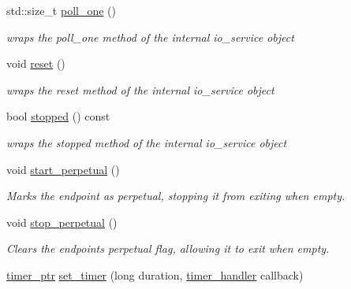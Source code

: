 \begin{DoxyCompactItemize}
std\+::size\+\_\+t \mbox{\hyperlink{classwebsocketpp_1_1transport_1_1asio_1_1endpoint_ae413ac572300c418cfd822845960cc6c}{poll\+\_\+one}} ()
\begin{DoxyCompactList}\small\item\em wraps the poll\+\_\+one method of the internal io\+\_\+service object \end{DoxyCompactList}\item 
\mbox{\label{classwebsocketpp_1_1transport_1_1asio_1_1endpoint_ac79a1a69f86df035471ccdc9f4aea351}} 
void \mbox{\hyperlink{classwebsocketpp_1_1transport_1_1asio_1_1endpoint_ac79a1a69f86df035471ccdc9f4aea351}{reset}} ()
\begin{DoxyCompactList}\small\item\em wraps the reset method of the internal io\+\_\+service object \end{DoxyCompactList}\item 
\mbox{\label{classwebsocketpp_1_1transport_1_1asio_1_1endpoint_a633264e7fd0ab7623cac336f2eb85aa0}} 
bool \mbox{\hyperlink{classwebsocketpp_1_1transport_1_1asio_1_1endpoint_a633264e7fd0ab7623cac336f2eb85aa0}{stopped}} () const
\begin{DoxyCompactList}\small\item\em wraps the stopped method of the internal io\+\_\+service object \end{DoxyCompactList}\item 
void \mbox{\hyperlink{classwebsocketpp_1_1transport_1_1asio_1_1endpoint_a5a707078d482c141edf0a8cdd0bc6345}{start\+\_\+perpetual}} ()
\begin{DoxyCompactList}\small\item\em Marks the endpoint as perpetual, stopping it from exiting when empty. \end{DoxyCompactList}\item 
void \mbox{\hyperlink{classwebsocketpp_1_1transport_1_1asio_1_1endpoint_aaaf8c9ef3f41be6968674bd704dc23b0}{stop\+\_\+perpetual}} ()
\begin{DoxyCompactList}\small\item\em Clears the endpoint\textquotesingle{}s perpetual flag, allowing it to exit when empty. \end{DoxyCompactList}\item 
\mbox{\hyperlink{classwebsocketpp_1_1transport_1_1asio_1_1endpoint_a1802f5762009dbed117ff793fa87468f}{timer\+\_\+ptr}} \mbox{\hyperlink{classwebsocketpp_1_1transport_1_1asio_1_1endpoint_a63525bd209bb3dabf373b9b72d37e78e}{set\+\_\+timer}} (long duration, \mbox{\hyperlink{namespacewebsocketpp_1_1transport_a946cc56ff41139f3002149c15fd87bc9}{timer\+\_\+handler}} callback)

\end{DoxyCompactItemize}
